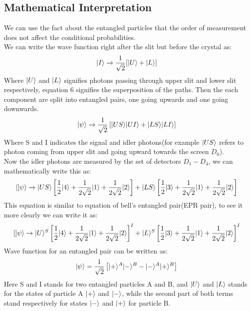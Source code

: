     \subsection{Mathematical Interpretation}
    We can use the fact about the entangled particles that the order of measurement does not affect the conditional probabilities. \\
    We can write the wave function right after the slit but before the crystal as:
    \begin{equation}
        \lvert I\rangle \xrightarrow[]{} \frac{1}{\sqrt{2}}[\lvert U\rangle+\lvert L\rangle]
    \end{equation}
    Where $\lvert U\rangle$ and $\lvert L\rangle$ signifies photons passing through upper slit and lower slit respectively, equation 6 signifies the superposition of the paths. Then the each component are split into entangled pairs, one going upwards and one going downwards.
    \begin{equation}
        \lvert\psi\rangle \xrightarrow{} \frac{1}{\sqrt{2}}\left[\lvert US\rangle\lvert UI\rangle + \lvert LS\rangle\lvert LI\rangle\right]
    \end{equation}
    Where S and I indicates the signal and idler photons(for example $\lvert US\rangle$ refers to photon coming from upper slit and going upward towards the screen $D_0$). \\
    Now the idler photons are measured by the set of detectors $D_1 - D_4$, we can mathematically write this as:
    \begin{equation}
        \lvert]\psi\rangle \xrightarrow[]{} \lvert US\rangle\left[\frac{1}{2}\lvert4\rangle + \frac{1}{2\sqrt{2}}\lvert1\rangle + \frac{1}{2\sqrt{2}}\lvert2\rangle\right] + \lvert LS\rangle \left[\frac{1}{2}\lvert3\rangle + \frac{1}{2\sqrt{2}}\lvert1\rangle + \frac{1}{2\sqrt{2}}\lvert2\rangle \right]
    \end{equation}
    This equation is similar to equation of bell's entangled pair(EPR pair), to see it more clearly we can write it as:
    \begin{equation}
        \lvert]\psi\rangle \xrightarrow[]{} \lvert U\rangle^S\left[\frac{1}{2}\lvert4\rangle + \frac{1}{2\sqrt{2}}\lvert1\rangle + \frac{1}{2\sqrt{2}}\lvert2\rangle\right]^I + \lvert L\rangle^S \left[\frac{1}{2}\lvert3\rangle + \frac{1}{2\sqrt{2}}\lvert1\rangle + \frac{1}{2\sqrt{2}}\lvert2\rangle \right]^I
    \end{equation}
    Wave function for an entangled pair can be written as:
    \begin{equation}
        \lvert\psi\rangle = \frac{1}{\sqrt{2}}\left[\lvert+\rangle^A\lvert-\rangle^B - \lvert-\rangle^A\lvert+\rangle^B\right]
    \end{equation}
    Here S and I stands for two entangled particles A and B, and $\lvert U\rangle$ and $\lvert L\rangle$ stands for the states of particle A $\lvert+\rangle$ and $\lvert-\rangle$, while the second part of both terms stand respectively for states $\lvert-\rangle$ and $\lvert+\rangle$ for particle B.
